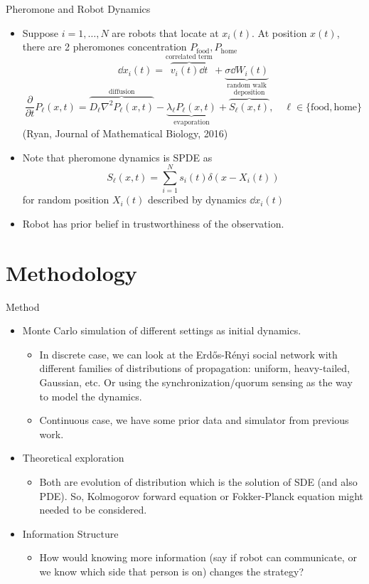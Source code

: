\documentclass[10pt]{beamer}
\begin{document}
\begin{frame}{Pheromone and Robot Dynamics}
\begin{itemize}
    \item Suppose $i=1,\dots,N$ are robots that locate at $x_i(t)$. At position $x(t)$, there are 2 pheromones concentration $P_\text{food},P_{\text{home}}$
    \[
    \dd x_i(t) = \overbrace{v_i(t) \dd t}^\text{correlated term} + \underbrace{\sigma \dd W_i(t)}_{\text{random walk}}
    \]
    \[
    \dfrac{\partial}{\partial t} P_\ell(x,t) = \overbrace{D_\ell \nabla^2P_\ell(x,t)}^{\text{diffusion}} - \underbrace{\lambda_\ell P_\ell(x,t)}_{\text{evaporation}} +\overbrace{S_\ell(x,t)}^{\text{deposition}}, \quad \ell\in\{\text{food},\text{home}\}
    \] (Ryan, Journal of Mathematical Biology, 2016)
    \item Note that pheromone dynamics is SPDE as \[S_\ell(x,t) = \sum_{i=1}^N s_i(t)\delta(x-X_i(t))\] for random position $X_i(t)$ described by dynamics $\dd x_i(t)$
    \item Robot has prior belief in trustworthiness of the observation.
\end{itemize}
\end{frame}
\section{Methodology}
\begin{frame}{Method}
    \begin{itemize}
        \item Monte Carlo simulation of different settings as initial dynamics.
        \begin{itemize}
            \item In discrete case, we can look at the Erd\H{o}s-R\'enyi social network with different families of distributions of propagation: uniform, heavy-tailed, Gaussian, etc. Or using the synchronization/quorum sensing as the way to model the dynamics.
            \item Continuous case, we have some prior data and simulator from previous work.
        \end{itemize}
        \item Theoretical exploration
        \begin{itemize}
            \item Both are evolution of distribution which is the solution of SDE (and also PDE). So, Kolmogorov forward equation or Fokker-Planck equation might needed to be considered.
        \end{itemize}
        \item Information Structure
        \begin{itemize}
            \item How would knowing more information (say if robot can communicate, or we know which side that person is on) changes the strategy?
        \end{itemize}
    \end{itemize}
\end{frame}
\end{document}
